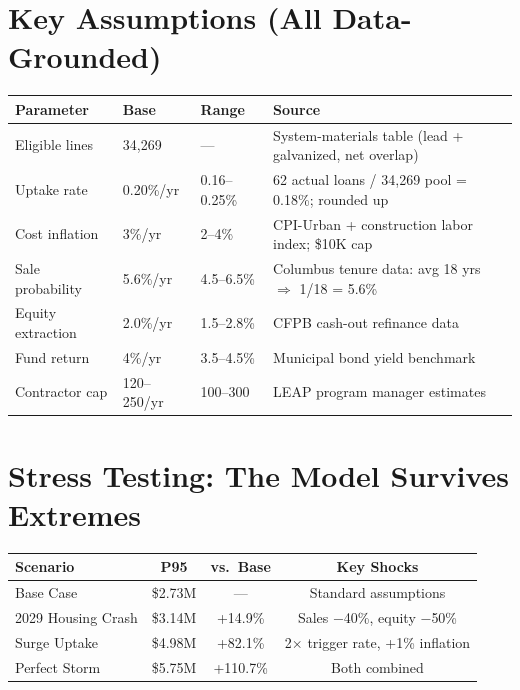 \documentclass[11pt, letterpaper]{article}
\begin{document}
\vspace{-0.2cm}
\section*{Key Assumptions (All Data-Grounded)}

\begin{center}
\renewcommand{\arraystretch}{1.15}
\small
\begin{tabular}{@{}llll@{}}
\toprule
\textbf{Parameter} & \textbf{Base} & \textbf{Range} & \textbf{Source} \\
\midrule
Eligible lines & 34{,}269 & --- & System-materials table (lead + galvanized, net overlap) \\
Uptake rate & 0.20\%/yr & 0.16--0.25\% & 62 actual loans / 34{,}269 pool = 0.18\%; rounded up \\
Cost inflation & 3\%/yr & 2--4\% & CPI-Urban + construction labor index; \$10K cap \\
Sale probability & 5.6\%/yr & 4.5--6.5\% & Columbus tenure data: avg 18 yrs $\Rightarrow$ 1/18 = 5.6\% \\
Equity extraction & 2.0\%/yr & 1.5--2.8\% & CFPB cash-out refinance data \\
Fund return & 4\%/yr & 3.5--4.5\% & Municipal bond yield benchmark \\
Contractor cap & 120--250/yr & 100--300 & LEAP program manager estimates \\
\bottomrule
\end{tabular}
\end{center}

\vspace{-0.2cm}
\section*{Stress Testing: The Model Survives Extremes}

\begin{center}
\renewcommand{\arraystretch}{1.2}
\begin{tabular}{@{}lccc@{}}
\toprule
\textbf{Scenario} & \textbf{P95} & \textbf{vs.\ Base} & \textbf{Key Shocks} \\
\midrule
Base Case & \$2.73M & --- & Standard assumptions \\
2029 Housing Crash & \$3.14M & +14.9\% & Sales $-$40\%, equity $-$50\% \\
Surge Uptake & \$4.98M & +82.1\% & 2$\times$ trigger rate, +1\% inflation \\
Perfect Storm & \$5.75M & +110.7\% & Both combined \\
\bottomrule
\end{tabular}
\end{center}
\end{document}
